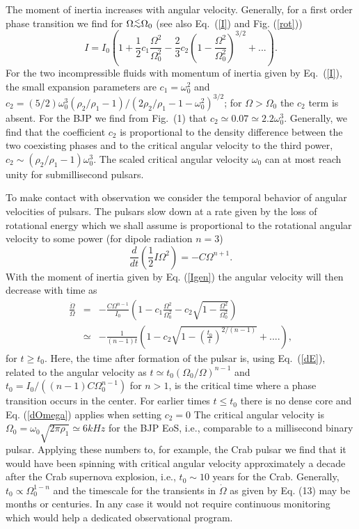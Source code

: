 \begin{multicols}{2}
The moment of inertia increases with angular velocity. Generally, for a
first order phase transition we find for 
$\Omega \raisebox{-.5ex}{$\stackrel{<}{\sim}$}\Omega_0$
(see also Eq.\  (\ref{I}) and Fig. (\ref{rot}))
\begin{equation}
  I = I_0\left( 1+\frac{1}{2}c_1\frac{\Omega^2}{\Omega_0^2} -\frac{2}{3}c_2 
                (1-\frac{\Omega^2}{\Omega_0^2})^{3/2} + ...
      \right) . 
  \label{Igen}
\end{equation}
For the two incompressible fluids with momentum of inertia given by
Eq.\  (\ref{I}), the small expansion
parameters are $c_1=\omega_0^2$ and 
$c_2=(5/2)\omega_0^3(\rho_2/\rho_1-1)/(2\rho_2/
\rho_1-1-\omega_0^2)^{3/2}$; for $\Omega>\Omega_0$ the $c_2$ term is absent. 
For the BJP we find from Fig.\ (1) that
$c_2\simeq 0.07\simeq 2.2\omega_0^3$. Generally, we find that the
coefficient $c_2$ is proportional to the density difference between the 
two coexisting phases and to the critical angular velocity to the third power,
$c_2\sim (\rho_2/\rho_1-1)\omega_0^3$. The scaled critical angular velocity
$\omega_0$ can at most reach unity for submillisecond pulsars.


To make contact with observation we consider the temporal behavior
of angular velocities of pulsars. The pulsars slow down at a rate
given by the loss of rotational energy which we shall assume is
proportional to the rotational angular velocity to some power
(for dipole radiation $n=3$)
\begin{equation}
  \frac{d}{dt} \left(\frac{1}{2}I\Omega^2\right) = 
                  -C \Omega^{n+1}. 
   \label{dE}
\end{equation}
With the moment of inertia given by Eq. (\ref{Igen})
the angular velocity will then decrease with time as
\begin{eqnarray}
  \frac{\dot{\Omega}}{\Omega} &=& -\frac{C\Omega^{n-1}}{I_0}
  \left( 1-c_1\frac{\Omega^2}{\Omega_0^2}
          -c_2\sqrt{1-\frac{\Omega^2}{\Omega_0^2}} \right) \nonumber\\
  &\simeq& -\frac{1}{(n-1)t}
  \left( 1-c_2 \sqrt{1-(\frac{t_0}{t})^{2/(n-1)}} +....\right), 
  \label{dOmega}
\end{eqnarray}
for $t\ge t_0$. Here,
the time after formation of the pulsar is, using Eq.\  (\ref{dE}),
related to the angular velocity as
$t\simeq t_0(\Omega_0/\Omega)^{n-1}$ and 
$t_0=I_0/((n-1)C\Omega_0^{n-1})$ for $n>1$, is the critical time where
a phase transition occurs in the center. For earlier times $t\le t_0$ there
is no dense core and Eq. (\ref{dOmega}) applies when setting $c_2=0$
The critical angular velocity is $\Omega_0=\omega_0\sqrt{2\pi \rho_1}\simeq
6 kHz$ for the BJP EoS, i.e., comparable to a millisecond binary
pulsar. Applying these numbers to, for example, the Crab pulsar we find that
it would have been spinning with critical angular velocity approximately 
a decade after the Crab supernova explosion,
i.e., $t_0\sim 10$ years for the Crab. Generally,
$t_0\propto\Omega_0^{1-n}$ and the timescale for the transients in
$\dot{\Omega}$ as given by Eq. (13) may be months or centuries. In any
case it would not require continuous monitoring which would help
a dedicated observational program.


\end{multicols}
